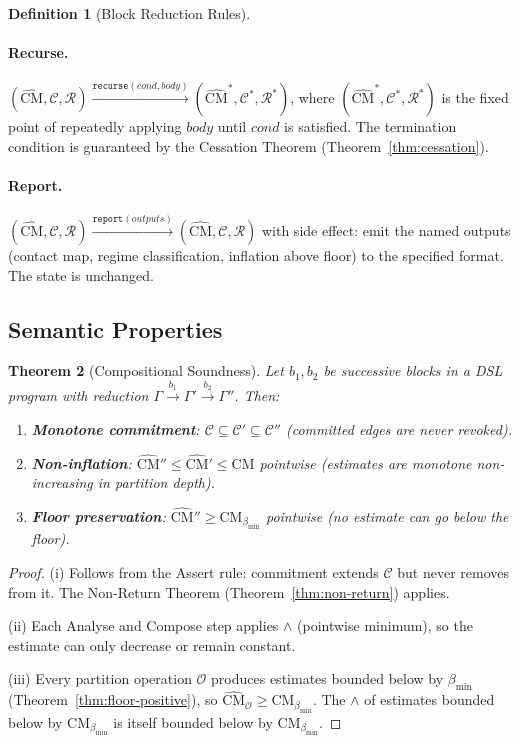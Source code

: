 \documentclass[12pt,a4paper,twocolumn]{article}
\theoremstyle{plain}
\newtheorem{theorem}{Theorem}[section]
\theoremstyle{definition}
\newtheorem{definition}[theorem]{Definition}
\theoremstyle{remark}
\newcommand{\CM}{\mathrm{CM}}
\newcommand{\bmin}{\beta_{\min}}
\newcommand{\CMbmin}{\CM_{\bmin}}
\begin{document}
\begin{definition}[Block Reduction Rules]
\paragraph{Recurse.}
$(\hat{\CM}, \mathcal{C}, \mathcal{R})
  \xrightarrow{\texttt{recurse}(\textit{cond}, \textit{body})}
  (\hat{\CM}^*, \mathcal{C}^*, \mathcal{R}^*)$,
where $(\hat{\CM}^*, \mathcal{C}^*, \mathcal{R}^*)$ is the fixed point of
repeatedly applying $\textit{body}$ until $\textit{cond}$ is satisfied.  The
termination condition is guaranteed by the Cessation Theorem
(Theorem~\ref{thm:cessation}).

\paragraph{Report.}
$(\hat{\CM}, \mathcal{C}, \mathcal{R})
  \xrightarrow{\texttt{report}(\textit{outputs})}
  (\hat{\CM}, \mathcal{C}, \mathcal{R})$
with side effect: emit the named outputs (contact map, regime classification,
inflation above floor) to the specified format.  The state is unchanged.
\end{definition}

\subsection{Semantic Properties}

\begin{theorem}[Compositional Soundness]
\label{thm:compositional}
Let $b_1, b_2$ be successive blocks in a DSL program with reduction
$\Gamma \xrightarrow{b_1} \Gamma' \xrightarrow{b_2} \Gamma''$.  Then:
\begin{enumerate}[label=(\roman*)]
  \item \textbf{Monotone commitment}: $\mathcal{C} \subseteq \mathcal{C}'
    \subseteq \mathcal{C}''$ (committed edges are never revoked).
  \item \textbf{Non-inflation}: $\hat{\CM}'' \leq \hat{\CM}' \leq \hat{\CM}$
    pointwise (estimates are monotone non-increasing in partition depth).
  \item \textbf{Floor preservation}: $\hat{\CM}'' \geq \CMbmin$ pointwise
    (no estimate can go below the floor).
\end{enumerate}
\end{theorem}

\begin{proof}
(i) Follows from the Assert rule: commitment extends $\mathcal{C}$ but never
removes from it.  The Non-Return Theorem (Theorem~\ref{thm:non-return})
applies.

(ii) Each Analyse and Compose step applies $\wedge$ (pointwise minimum),
so the estimate can only decrease or remain constant.

(iii) Every partition operation $\mathcal{O}$ produces estimates bounded
below by $\bmin$ (Theorem~\ref{thm:floor-positive}), so $\hat{\CM}_\mathcal{O}
\geq \CMbmin$.  The $\wedge$ of estimates bounded below by $\CMbmin$ is itself
bounded below by $\CMbmin$.
\end{proof}
\end{document}
